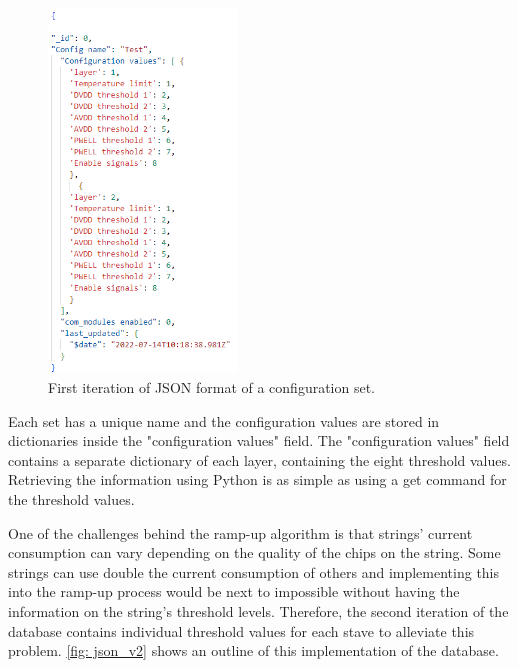 \documentclass[main.tex]{subfiles}
\begin{document}
\begin{figure}[!ht]
    \centering
    \includegraphics[width=5cm, scale=1]{images/JSON_example_v1.png}
    \caption{First iteration of JSON format of a configuration set.}
    \label{fig: json_v1}
\end{figure}
\FloatBarrier

Each set has a unique name and the configuration values are stored in dictionaries inside the "configuration values" field. The "configuration values" field contains a separate dictionary of each layer, containing the eight threshold values. Retrieving the information using Python is as simple as using a get command for the threshold values.

One of the challenges behind the ramp-up algorithm is that strings' current consumption can vary depending on the quality of the chips on the string. Some strings can use double the current consumption of others and implementing this into the ramp-up process would be next to impossible without having the information on the string's threshold levels. Therefore, the second iteration of the database contains individual threshold values for each stave to alleviate this problem. \autoref{fig: json_v2} shows an outline of this implementation of the database.
\end{document}
